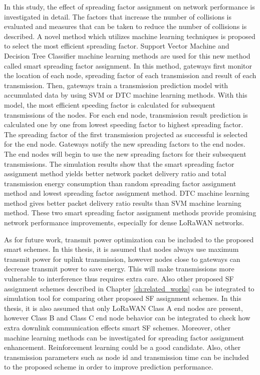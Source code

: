 In this study, the effect of spreading factor assignment on network performance is investigated in detail. The factors that increase the number of collisions is evaluated and measures that can be taken to reduce the number of collisions is described. A novel method which utilizes machine learning techniques is proposed to select the most efficient spreading factor. Support Vector Machine and Decision Tree Classifier machine learning methods are used for this new method called smart spreading factor assignment. In this method, gateways first monitor the location of each node, spreading factor of each transmission and result of each transmission. Then, gateways train a transmission prediction model with accumulated data by using SVM or DTC machine learning methods. With this model, the most efficient speeding factor is calculated for subsequent transmissions of the nodes. For each end node, transmission result prediction is calculated one by one from lowest speeding factor to highest spreading factor. The spreading factor of the first transmission projected as successful is selected for the end node. Gateways notify the new spreading factors to the end nodes. The end nodes will begin to use the new spreading factors for their subsequent transmissions. The simulation results show that the smart spreading factor assignment method yields better network packet delivery ratio and total transmission energy consumption than random spreading factor assignment method and lowest spreading factor assignment method. DTC machine learning method gives better packet delivery ratio results than SVM machine learning method. These two smart spreading factor assignment methods provide promising network performance improvements, especially for dense LoRaWAN networks.

As for future work, transmit power optimization can be included to the proposed smart schemes. In this thesis, it is assumed that nodes always use maximum transmit power for uplink transmission, however nodes close to gateways can decrease transmit power to save energy. This will make transmissions more vulnerable to interference thus requires extra care. Also other proposed SF assignment schemes described in Chapter \ref{ch:related_works} can be integrated to simulation tool for comparing other proposed SF assignment schemes. In this thesis, it is also assumed that only LoRaWAN Class A end nodes are present, however Class B and Class C end node behavior can be integrated to check how extra downlink communication effects smart SF schemes. Moreover, other machine learning methods can be investigated for spreading factor assignment enhancement. Reinforcement learning could be a good candidate. Also, other transmission parameters such as node id and transmission time can be included to the proposed scheme in order to improve prediction performance.
